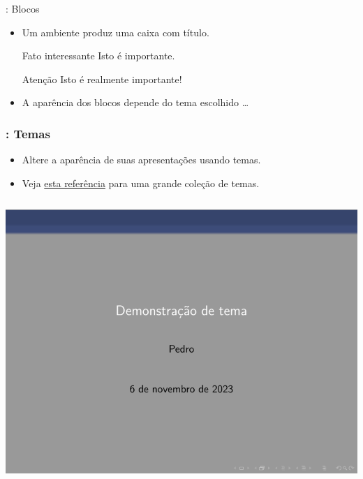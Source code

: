\documentclass{beamer}
\begin{document}
\begin{frame}[fragile]{\insertsection: Blocos}
\begin{itemize}
  \item Um ambiente  produz uma caixa com título.
  \begin{exampletwouptiny}
\begin{block}{Fato interessante}
Isto é importante.
\end{block}

\begin{alertblock}{Atenção}
Isto é realmente importante!
\end{alertblock}
  \end{exampletwouptiny}
  \item A aparência dos blocos depende do tema escolhido \ldots
\end{itemize}
\end{frame}

\begin{frame}[fragile]
\frametitle{\insertsection: Temas}
\begin{itemize}
  \item Altere a aparência de  suas apresentações usando \alert{temas}.
  \item Veja \href{https://deic.uab.cat/~iblanes/beamer_gallery/index.html}{esta referência} para uma grande coleção de temas.
\end{itemize}
\begin{minipage}{0.6\linewidth}
  \inputminted[fontsize=\scriptsize,frame=single,resetmargins]{latex}{beamer-theme.tex}
\end{minipage}
\begin{minipage}{0.35\linewidth}
  \includegraphics[width=\textwidth]{beamer-theme.pdf} %
\end{minipage}
\end{frame}
\end{document}

